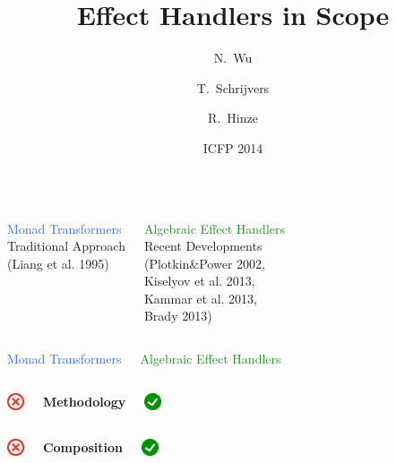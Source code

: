 \documentclass[xcolor=pdftex,dvipsnames,table]{beamer}
\title{Effect Handlers in Scope}
\author[Wu, Schrijvers, Hinze]
{N.~Wu\inst{1} \and T.~Schrijvers\inst{2} \and R.~Hinze\inst{1}}
\institute[VFU] %
{
  \inst{1}%
  University of Oxford
  \and
  \inst{2}%
  Ghent University
}
\date[ICFP 2014]{ICFP 2014}
\def\checkmark{\includegraphics[height=0.5cm]{checkmark}}
\def\crossmark{\includegraphics[height=0.5cm]{crossmark}}
\begin{document}
\frame{\titlepage}

\begin{frame}
  \begin{columns}[c]
    \begin{center}
      \Large{\textcolor{RoyalBlue}{Monad Transformers}}\\
      \small{Traditional Approach \\
      (Liang et al. 1995)}
    \end{center}

    \begin{center}
      \Large{\textcolor{ForestGreen}{Algebraic Effect Handlers}}\\
      \small{Recent Developments} \\
      \small{(Plotkin\&Power 2002, \\
      Kiselyov et al. 2013, \\
      Kammar et al. 2013, \\
      Brady 2013)}
    \end{center}
  \end{columns}
\end{frame}

\begin{frame}
  \begin{columns}[c]
    \begin{center}
      \Large{\textcolor{RoyalBlue}{Monad Transformers}}
    \end{center}
    \begin{center}
      \Large{\textcolor{ForestGreen}{Algebraic Effect Handlers}}
    \end{center}
  \end{columns}
  \bigskip
  \begin{columns}[c]
    \begin{center}
      \crossmark
    \end{center}
    \begin{center}
      \textbf{Methodology}
    \end{center}
    \begin{center}
      \checkmark
    \end{center}
  \end{columns}
  \begin{columns}[c]
    \begin{center}
      \crossmark
    \end{center}
    \begin{center}
      \textbf{Composition}
    \end{center}
    \begin{center}
      \checkmark
    \end{center}
  \end{columns}
\end{frame}
\end{document}
